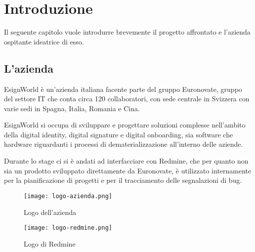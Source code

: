
\chapter{Introduzione}
\label{cap:introduzione}

Il seguente capitolo vuole introdurre brevemente il progetto affrontato e l'azienda ospitante ideatrice di esso. \\



\iffalse
\noindent Esempio di utilizzo di un termine nel glossario \\
\gls{api}. \\
\noindent Esempio di citazione in linea \\
\cite{site:agile-manifesto}. \\
\noindent Esempio di citazione nel pie' di pagina \\
citazione\footcite{womak:lean-thinking} \\
\fi


\section{L'azienda}

\par EsignWorld è un'azienda italiana facente parte del gruppo Euronovate, gruppo del settore IT che conta circa 120 collaboratori, con sede centrale in Svizzera con varie sedi in Spagna, Italia, Romania e Cina. 
\newline
\newline
\par EsignWorld si occupa di sviluppare e progettare soluzioni complesse nell'ambito della digital identity, digital signature e digital onboarding, sia software che hardware riguardanti i processi di dematerializzazione all'interno delle aziende.
\newline
\newline
\par Durante lo stage ci si è andati ad interfacciare con Redmine, che per quanto non sia un prodotto sviluppato direttamente da Euronovate, è utilizzato internamente per la pianificazione di progetti e per il tracciamento delle segnalazioni di bug.
\newline
\begin{figure}[!h] 
	\centering 
	\texttt{[image: logo-azienda.png]} 
	\caption{Logo dell'azienda}
\end{figure}
\begin{figure}[!h] 
	\centering 
	\texttt{[image: logo-redmine.png]} 
	\caption{Logo di Redmine}
\end{figure}

